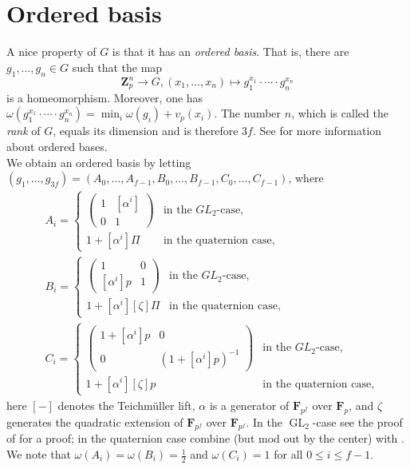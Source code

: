 \documentclass[11pt, oneside]{article}
\DeclareMathOperator{\GL}{GL}
\theoremstyle{definition}
\begin{document}
	\section{Ordered basis}
	A nice property of $G$ is that it has an \emph{ordered basis}. That is, there are $g_1,\dots,g_n\in G$ such that the map $$\mathbf Z_p^n\to G,(x_1,\dots,x_n)\mapsto g_1^{x_1}\cdot\cdots\cdot g_n^{x_n}$$ is a homeomorphism. Moreover, one has $\omega(g_1^{x_1}\cdot\cdots\cdot g_n^{x_n})=\min_i\omega(g_i)+v_p(x_i)$. The number $n$, which is called the \emph{rank} of $G$, equals its dimension and is therefore $3f$. See \cite[\S26]{Schneider2011} for more information about ordered bases.\\
	We obtain an ordered basis by letting $(g_1,\dots,g_{3f})=(A_0,\dots,A_{f-1},B_0,\dots,B_{f-1},C_0,\dots,C_{f-1})$, where \begin{align*}
		&A_i=\begin{cases}
			\begin{pmatrix}
				1&[\alpha^i]\\0&1
			\end{pmatrix}&\text{in the $GL_2$-case,}\\
			1+[\alpha^i]\Pi&\text{in the quaternion case,}
		\end{cases}\\
		&B_i=\begin{cases}
			\begin{pmatrix}
				1&0\\{[\alpha^i]}p&1
			\end{pmatrix}&\text{in the $GL_2$-case,}\\
			1+[\alpha^i][\zeta]\Pi&\text{in the quaternion case,}
		\end{cases}\\
		&C_i=\begin{cases}
			\begin{pmatrix}
				1+[\alpha^i]p&0\\0&(1+[\alpha^i]p)^{-1}
			\end{pmatrix}&\text{in the $GL_2$-case,}\\
			1+[\alpha^i][\zeta]p&\text{in the quaternion case,}
		\end{cases}
	\end{align*}
	here $[-]$ denotes the Teichm\"uller lift, $\alpha$ is a generator of $\mathbf F_{p^f}$ over $\mathbf F_p$, and $\zeta$ generates the quadratic extension of $\mathbf F_{p^f}$ over $\mathbf F_{p^f}$. In the $\GL_2$-case see the proof of \cite[Prop.~5.3.3]{BHHMS1} for a proof; in the quaternion case combine \cite[Prop.~2.1]{hu2024modprepresentationsquaternion} (but mod out by the center) with \cite[Prop.~26.5]{Schneider2011}.\\ We note that $\omega(A_i)=\omega(B_i)=\frac12$ and $\omega(C_i)=1$ for all $0\leq i\leq f-1$.\\
	
\end{document}
